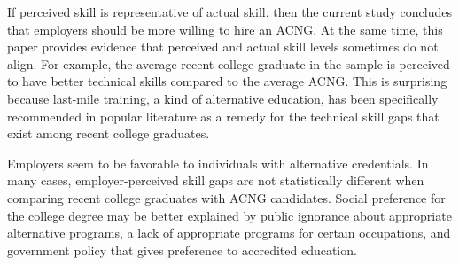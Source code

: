\documentclass[review]{elsarticle}
\begin{document}
If perceived skill is representative of actual skill,
then the current study concludes that employers should be more willing to hire an ACNG.
At the same time, this paper provides evidence that perceived and actual skill levels sometimes do not align.
For example, the average recent college graduate in the sample is perceived to have better technical skills compared to the average ACNG.
This is surprising because last-mile training, a kind of alternative education,
has been specifically recommended in popular literature as a remedy for the technical skill gaps that exist among recent college graduates.

Employers seem to be favorable to individuals with alternative credentials.
In many cases, employer-perceived skill gaps are not statistically different when comparing recent college graduates with ACNG candidates.
Social preference for the college degree may be better explained by public ignorance about appropriate alternative programs,
a lack of appropriate programs for certain occupations,
and government policy that gives preference to accredited education.



\end{document}
